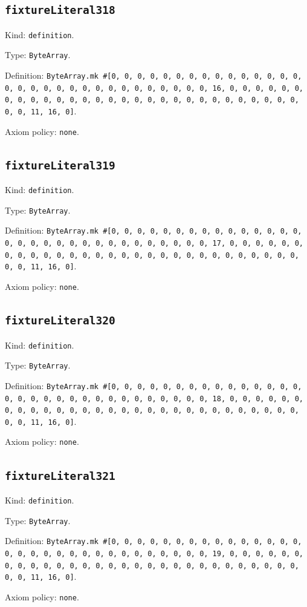 \documentclass[11pt]{article}
\begin{document}
\subsection*{\texttt{fixtureLiteral318}}
\noindent Kind: \texttt{definition}.\par
\noindent Type: \texttt{ByteArray}.\par
\noindent Definition: \texttt{ByteArray.mk \#[0, 0, 0, 0, 0, 0, 0, 0, 0, 0, 0, 0, 0, 0, 0, 0, 0, 0, 0, 0, 0, 0, 0, 0, 0, 0, 0, 0, 0, 0, 0, 16, 0, 0, 0, 0, 0, 0, 0, 0, 0, 0, 0, 0, 0, 0, 0, 0, 0, 0, 0, 0, 0, 0, 0, 0, 0, 0, 0, 0, 0, 0, 0, 11, 16, 0]}.\par
\noindent Axiom policy: \texttt{none}.\par
\subsection*{\texttt{fixtureLiteral319}}
\noindent Kind: \texttt{definition}.\par
\noindent Type: \texttt{ByteArray}.\par
\noindent Definition: \texttt{ByteArray.mk \#[0, 0, 0, 0, 0, 0, 0, 0, 0, 0, 0, 0, 0, 0, 0, 0, 0, 0, 0, 0, 0, 0, 0, 0, 0, 0, 0, 0, 0, 0, 0, 17, 0, 0, 0, 0, 0, 0, 0, 0, 0, 0, 0, 0, 0, 0, 0, 0, 0, 0, 0, 0, 0, 0, 0, 0, 0, 0, 0, 0, 0, 0, 0, 11, 16, 0]}.\par
\noindent Axiom policy: \texttt{none}.\par
\subsection*{\texttt{fixtureLiteral320}}
\noindent Kind: \texttt{definition}.\par
\noindent Type: \texttt{ByteArray}.\par
\noindent Definition: \texttt{ByteArray.mk \#[0, 0, 0, 0, 0, 0, 0, 0, 0, 0, 0, 0, 0, 0, 0, 0, 0, 0, 0, 0, 0, 0, 0, 0, 0, 0, 0, 0, 0, 0, 0, 18, 0, 0, 0, 0, 0, 0, 0, 0, 0, 0, 0, 0, 0, 0, 0, 0, 0, 0, 0, 0, 0, 0, 0, 0, 0, 0, 0, 0, 0, 0, 0, 11, 16, 0]}.\par
\noindent Axiom policy: \texttt{none}.\par
\subsection*{\texttt{fixtureLiteral321}}
\noindent Kind: \texttt{definition}.\par
\noindent Type: \texttt{ByteArray}.\par
\noindent Definition: \texttt{ByteArray.mk \#[0, 0, 0, 0, 0, 0, 0, 0, 0, 0, 0, 0, 0, 0, 0, 0, 0, 0, 0, 0, 0, 0, 0, 0, 0, 0, 0, 0, 0, 0, 0, 19, 0, 0, 0, 0, 0, 0, 0, 0, 0, 0, 0, 0, 0, 0, 0, 0, 0, 0, 0, 0, 0, 0, 0, 0, 0, 0, 0, 0, 0, 0, 0, 11, 16, 0]}.\par
\noindent Axiom policy: \texttt{none}.\par
\end{document}
